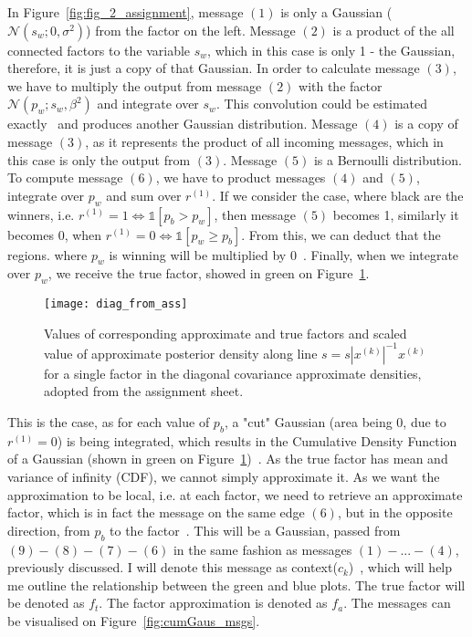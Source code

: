 \documentclass[a4paper,11pt]{article}
\theoremstyle{mytheor}
\begin{document}
In Figure~\ref{fig:fig_2_assignment}, message $(1)$ is only a Gaussian ($\mathcal{N}(s_w;0,\sigma^2)$) from the factor on the left. Message $(2)$ is a product of the all connected factors to the variable $s_w$, which in this case is only 1 - the Gaussian, therefore, it is just a copy of that Gaussian. In order to calculate message $(3)$, we have to multiply the output from message $(2)$ with the factor $\mathcal{N}(p_w;s_w,\beta^2)$ and integrate over $s_w$. This convolution could be estimated exactly~\cite[Equation 2.115]{bishop2006pattern} and produces another Gaussian distribution. Message $(4)$ is a copy of message $(3)$, as it represents the product of all incoming messages, which in this case is only the output from $(3)$. Message $(5)$ is a Bernoulli distribution. To compute message $(6)$, we have to product messages $(4)$ and $(5)$, integrate over $p_w$ and sum over $r^{(1)}$. If we consider the case, where black are the winners, i.e. $r^{(1)}=1 \Leftrightarrow \mathbb{1}[p_b > p_w]$, then message $(5)$ becomes 1, similarly it becomes 0, when $r^{(1)}=0 \Leftrightarrow \mathbb{1}[p_w \geq p_b]$. From this, we can deduct that the regions. where $p_w$ is winning will be multiplied by 0~\cite{bishop2013model}. Finally, when we integrate over $p_w$, we receive the true factor, showed in green on Figure~\ref{fig:diag_from_orig}.

\begin{figure}[htpb!]
    \centering
    \texttt{[image: diag\_from\_ass]}
    \caption{Values of corresponding approximate and true factors and scaled value of approximate posterior density along line $s=s|x^{(k)}|^{-1}x^{(k)}$ for a single factor in the diagonal covariance approximate densities, adopted from the assignment sheet.}
    \label{fig:diag_from_orig}
\end{figure}

This is the case, as for each value of $p_b$, a "cut" Gaussian (area being 0, due to $r^{(1)}=0$) is being integrated, which results in the Cumulative Density Function of a Gaussian (shown in green on Figure~\ref{fig:diag_from_orig})~\cite{bishop2013model}. As the true factor has mean and variance of infinity (CDF), we cannot simply approximate it. As we want the approximation to be local, i.e. at each factor, we need to retrieve an approximate factor, which is in fact the message on the same edge $(6)$, but in the opposite direction, from $p_b$ to the factor~\cite{bishop2013model}. This will be a Gaussian, passed from $(9)-(8)-(7)-(6)$ in the same fashion as messages $(1)-...-(4)$, previously discussed. I will denote this message as context($c_k$)~\cite{bishop2013model}, which will help me outline the relationship between the green and blue plots. The true factor will be denoted as $f_t$. The factor approximation is denoted as $f_a$. The messages can be visualised on Figure~\ref{fig:cumGaus_msgs}.
\end{document}
